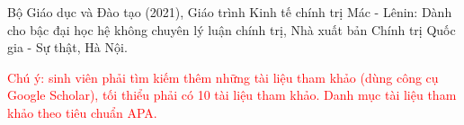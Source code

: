 \documentclass{report}
\begin{document}
\begin{thebibliography}{99}
\item Bộ Giáo dục và Đào tạo (2021), Giáo trình Kinh tế chính trị Mác - Lênin: Dành cho bậc đại học hệ không chuyên lý luận chính trị, Nhà xuất bản Chính trị Quốc gia - Sự thật, Hà Nội.


\end{thebibliography}
\textcolor{red}{Chú ý: sinh viên phải tìm kiếm thêm những tài liệu tham khảo (dùng công cụ Google Scholar), tối thiểu phải có 10 tài liệu tham khảo. Danh mục tài liệu tham khảo theo tiêu chuẩn APA.}
\end{document}
